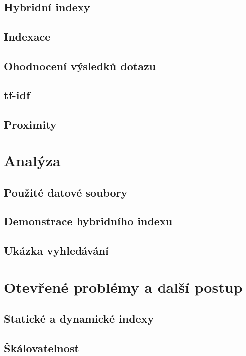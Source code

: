 \documentclass[11pt]{article}
\begin{document}
\subsection{Hybridní indexy}
\subsection{Indexace}

\subsection{Ohodnocení výsledků dotazu}
\subsection{tf-idf}
\subsection{Proximity}


\section{Analýza}
\subsection{Použité datové soubory}
\subsection{Demonstrace hybridního indexu}
\subsection{Ukázka vyhledávání}

\section{Otevřené problémy a další postup}
\subsection{Statické a dynamické indexy}
\subsection{Škálovatelnost}
\end{document}
